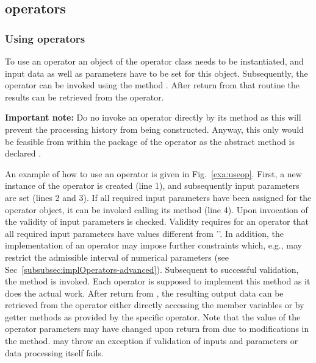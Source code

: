 \subsection{\alida operators}
\label{subsec:operators-programming}

\subsubsection{Using operators}
\label{subsec:using}
To use an operator an object of the operator class needs to be instantiated,
and input data as well as parameters have to be set for this object.
Subsequently, the operator can be invoked using the method
.
After return from that routine the results can be retrieved from the operator.

\textbf{Important note:} Do no invoke an operator directly by its  method
as this will prevent the processing history from being constructed.
Anyway, this only would be feasible from within the package of the operator
as the abstract method  is declared .

An example of how to use an operator is given in Fig.~\ref{exa:useop}.
First, a new instance of the operator is created (line 1), and subsequently
input parameters are set (lines 2 and 3).
If all required input parameters have been assigned for the operator object,
it can be invoked calling its  method (line 4). 
Upon invocation of   the validity of input parameters is checked. 
Validity requires for an operator that all required input parameters
have values different from ''.
In addition, the implementation of an operator may impose further constraints
which, e.g., may restrict the admissible interval of numerical parameters
(see Sec~\ref{subsubsec:implOperators-advanced}).
Subsequent to successful validation, the method 
is invoked. Each operator is supposed to implement this method as it does the
actual work. After return from , the
resulting output data can be retrieved from the operator either directly accessing the member
variables or by getter methods as provided by the specific operator.
Note that the value of the operator parameters may
have changed upon return from  due 
to modifications in the  method.
 may throw an exception if validation of inputs and parameters or
data processing itself fails.\\

